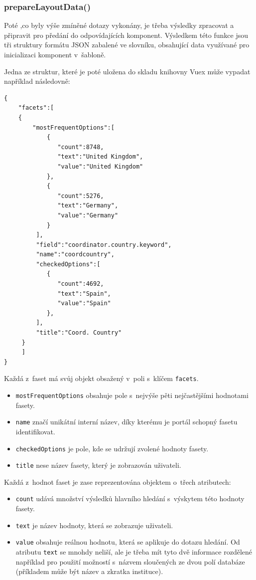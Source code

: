 \subsubsection*{prepareLayoutData()}
Poté ,co byly výše zmíněné dotazy vykonány, je třeba výsledky zpracovat a připravit pro předání do odpovídajících komponent. Výsledkem této funkce jsou tři struktury formátu JSON zabalené ve slovníku, obsahující data využívané pro inicializaci komponent v~šabloně.

Jedna ze struktur, které je poté uložena do skladu knihovny Vuex může vypadat například následovně:

\begin{verbatim}
{
    "facets":[
    {
        "mostFrequentOptions":[  
            {  
               "count":8748,
               "text":"United Kingdom",
               "value":"United Kingdom"
            },
            {  
               "count":5276,
               "text":"Germany",
               "value":"Germany"
            }
         ],
         "field":"coordinator.country.keyword",
         "name":"coordcountry",
         "checkedOptions":[  
            {  
               "count":4692,
               "text":"Spain",
               "value":"Spain"
            },
         ],
         "title":"Coord. Country"
     }
     ]
}
\end{verbatim}
Každá z~faset má svůj objekt obsažený v~poli s~klíčem \texttt{facets}.
\begin{itemize}
\item \texttt{mostFrequentOptions} obsahuje pole s~nejvýše pěti nejčastějšími hodnotami fasety.
\item \texttt{name} značí unikátní interní název, díky kterému je portál schopný fasetu identifikovat.
\item \texttt{checkedOptions} je pole, kde se udržují zvolené hodnoty fasety.
\item \texttt{title} nese název fasety, který je zobrazován uživateli.
\end{itemize}
Každá z~hodnot faset je zase reprezentována objektem o~třech atributech:
\begin{itemize}
\item \texttt{count} udává množství výsledků hlavního hledání s~výskytem této hodnoty fasety.
\item \texttt{text} je název hodnoty, která se zobrazuje uživateli.
\item \texttt{value} obsahuje reálnou hodnotu, která se aplikuje do dotazu hledání. Od atributu \texttt{text} se mnohdy neliší, ale je třeba mít tyto dvě informace rozdělené například pro použití možností s~názvem sloučených ze dvou polí databáze (příkladem může být název a zkratka instituce).
\end{itemize}

